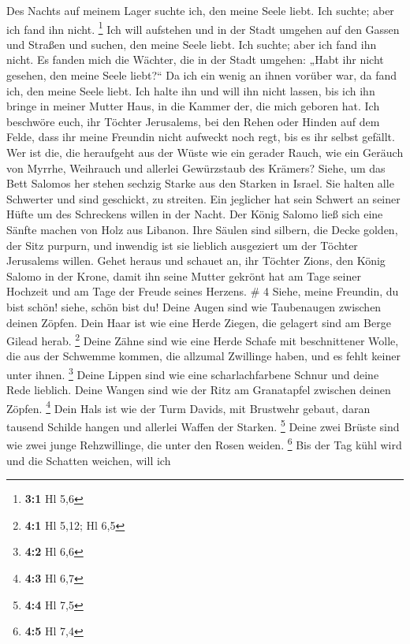  Des Nachts auf meinem Lager suchte ich, den meine Seele
liebt. Ich suchte; aber ich fand ihn nicht. \footnote{\textbf{3:1} Hl
  5,6}  Ich will aufstehen und in der Stadt umgehen auf den
Gassen und Straßen und suchen, den meine Seele liebt. Ich suchte; aber
ich fand ihn nicht.  Es fanden mich die Wächter, die in der
Stadt umgehen: „Habt ihr nicht gesehen, den meine Seele liebt?{}``
 Da ich ein wenig an ihnen vorüber war, da fand ich, den
meine Seele liebt. Ich halte ihn und will ihn nicht lassen, bis ich ihn
bringe in meiner Mutter Haus, in die Kammer der, die mich geboren hat.
 Ich beschwöre euch, ihr Töchter Jerusalems, bei den Rehen
oder Hinden auf dem Felde, dass ihr meine Freundin nicht aufweckt noch
regt, bis es ihr selbst gefällt.  Wer ist die, die
heraufgeht aus der Wüste wie ein gerader Rauch, wie ein Geräuch von
Myrrhe, Weihrauch und allerlei Gewürzstaub des Krämers? 
Siehe, um das Bett Salomos her stehen sechzig Starke aus den Starken in
Israel.  Sie halten alle Schwerter und sind geschickt, zu
streiten. Ein jeglicher hat sein Schwert an seiner Hüfte um des
Schreckens willen in der Nacht.  Der König Salomo ließ sich
eine Sänfte machen von Holz aus Libanon.  Ihre Säulen sind
silbern, die Decke golden, der Sitz purpurn, und inwendig ist sie
lieblich ausgeziert um der Töchter Jerusalems willen. 
Gehet heraus und schauet an, ihr Töchter Zions, den König Salomo in der
Krone, damit ihn seine Mutter gekrönt hat am Tage seiner Hochzeit und am
Tage der Freude seines Herzens. \# 4  Siehe, meine Freundin,
du bist schön! siehe, schön bist du! Deine Augen sind wie Taubenaugen
zwischen deinen Zöpfen. Dein Haar ist wie eine Herde Ziegen, die
gelagert sind am Berge Gilead herab. \footnote{\textbf{4:1} Hl 5,12; Hl
  6,5}  Deine Zähne sind wie eine Herde Schafe mit
beschnittener Wolle, die aus der Schwemme kommen, die allzumal Zwillinge
haben, und es fehlt keiner unter ihnen. \footnote{\textbf{4:2} Hl 6,6}
 Deine Lippen sind wie eine scharlachfarbene Schnur und
deine Rede lieblich. Deine Wangen sind wie der Ritz am Granatapfel
zwischen deinen Zöpfen. \footnote{\textbf{4:3} Hl 6,7}  Dein
Hals ist wie der Turm Davids, mit Brustwehr gebaut, daran tausend
Schilde hangen und allerlei Waffen der Starken. \footnote{\textbf{4:4}
  Hl 7,5}  Deine zwei Brüste sind wie zwei junge
Rehzwillinge, die unter den Rosen weiden. \footnote{\textbf{4:5} Hl 7,4}
 Bis der Tag kühl wird und die Schatten weichen, will ich
